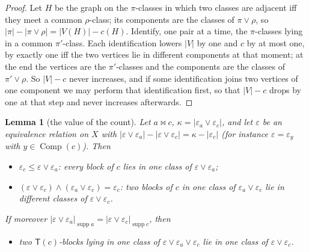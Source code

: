 \documentclass[11pt]{amsart}
\newtheorem{lemma}[theorem]{Lemma}
\theoremstyle{definition}
\newcommand{\supp}{\operatorname{supp}}
\newcommand{\T}{\mathsf{T}}
\newcommand{\Comp}{\operatorname{Comp}}
\newcommand{\mt}{\bowtie}      %
\begin{document}
\begin{proof}
Let $H$ be the graph on the $\pi$-classes in which two classes are adjacent iff they meet a common $\rho$-class; its components are the classes of $\pi\vee\rho$, so $|\pi|-|\pi\vee\rho|=|V(H)|-c(H)$. Identify, one pair at a time, the $\pi$-classes lying in a common $\pi'$-class. Each identification lowers $|V|$ by one and $c$ by at most one, by exactly one iff the two vertices lie in different components at that moment; at the end the vertices are the $\pi'$-classes and the components are the classes of $\pi'\vee\rho$. So $|V|-c$ never increases, and if some identification joins two vertices of one component we may perform that identification first, so that $|V|-c$ drops by one at that step and never increases afterwards.
\end{proof}

\begin{lemma}[the value of the count]\label{lem:value}
Let $a\mt c$, $\kappa=|\varepsilon_a\vee\varepsilon_c|$, and let $\varepsilon$ be an equivalence relation on $X$ with $|\varepsilon\vee\varepsilon_a|-|\varepsilon\vee\varepsilon_c|=\kappa-|\varepsilon_c|$ (for instance $\varepsilon=\varepsilon_y$ with $y\in\Comp(c)$). Then
\begin{itemize}[nosep]
\item[(A)] $\varepsilon_c\le\varepsilon\vee\varepsilon_a$: every block of $c$ lies in one class of $\varepsilon\vee\varepsilon_a$;
\item[(M)] $(\varepsilon\vee\varepsilon_c)\wedge(\varepsilon_a\vee\varepsilon_c)=\varepsilon_c$: two blocks of $c$ in one class of $\varepsilon_a\vee\varepsilon_c$ lie in different classes of $\varepsilon\vee\varepsilon_c$.
\end{itemize}
If moreover $|\varepsilon\vee\varepsilon_a|_{\supp a}=|\varepsilon\vee\varepsilon_c|_{\supp c}$, then
\begin{itemize}[nosep]
\item[(G2$'$)] two $\T(c)$-blocks lying in one class of $\varepsilon\vee\varepsilon_a\vee\varepsilon_c$ lie in one class of $\varepsilon\vee\varepsilon_c$.
\end{itemize}
\end{lemma}
\end{document}
